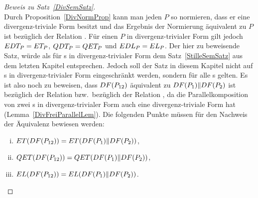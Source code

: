 \begin{proof}[Beweis zu Satz~\ref{DivSemSatz}]\mbox{}\\
  Durch Proposition~\ref{DivNormProp} kann man jeden \MEIO{} $P$ so normieren,
  dass er eine divergenz-triviale Form besitzt und das Ergebnis der Normierung
  äquivalent zu $P$ ist bezüglich der Relation \DRel{}. Für einen \MEIO{} $P$
  in divergenz-trivialer Form gilt jedoch $EDT _P = ET _P$, $QDT _P = QET
  _P$ und $EDL _P = EL _P$. Der hier zu beweisende Satz, würde als für
  \MEIO{}s in divergenz-trivialer Form dem Satz~\ref{StilleSemSatz} aus dem
  letzten Kapitel entsprechen. Jedoch soll der Satz in diesem Kapitel nicht auf
  \MEIO{}s in divergenz-trivialer Form eingeschränkt werden, sondern für alle
  \MEIO{}s gelten. Es ist also noch zu beweisen, dass $DF (P_{12})$ äquivalent
  zu $DF (P_1)\|DF (P_2)$ ist bezüglich der Relation \DRel{} bzw.\ bezüglich
  der Relation \QRel{}, da die Parallelkomposition von zwei \MEIO{}s in
  divergenz-trivialer Form auch eine divergenz-triviale Form hat
  (Lemma~\ref{DivFreiParallelLem}). Die folgenden Punkte müssen für den
  Nachweis der Äquivalenz bewiesen werden:
  \begin{enumerate}[(i)]
    \item $ET (DF (P_{12})) = ET (DF (P_1)\|DF (P_2))$,
    \item $QET (DF (P_{12})) = QET (DF (P_1)\|DF (P_2))$,
    \item $EL (DF (P_{12})) = EL (DF (P_1)\|DF (P_2))$.
  \end{enumerate}


\end{proof}
